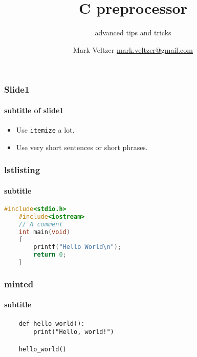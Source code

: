 \documentclass{beamer}
\title
{C preprocessor}
\subtitle
{advanced tips and tricks}
\author{Mark Veltzer \href{mailto:mark.veltzer@gmail.com}{mark.veltzer@gmail.com}}
\begin{document}
\begin{frame}
	\titlepage
\end{frame}



\begin{frame}
	\frametitle{Slide1}
	\framesubtitle{subtitle of slide1}
	\begin{itemize}
		\item Use \texttt{itemize} a lot.
		\item Use very short sentences or short phrases.
	\end{itemize}
\end{frame}

\begin{frame}[fragile]
	\frametitle{lstlisting}
	\framesubtitle{subtitle}
	\begin{lstlisting}[style=mymonokai, language=C++]
	#include<stdio.h>
	#include<iostream>
	// A comment
	int main(void)
	{
	    printf("Hello World\n");
	    return 0;
	}
	\end{lstlisting}
\end{frame}

\begin{frame}[fragile]
	\frametitle{minted}
	\framesubtitle{subtitle}
	\begin{verbatim}
	def hello_world():
	    print("Hello, world!")

	hello_world()
	\end{verbatim}
\end{frame}
\end{document}
